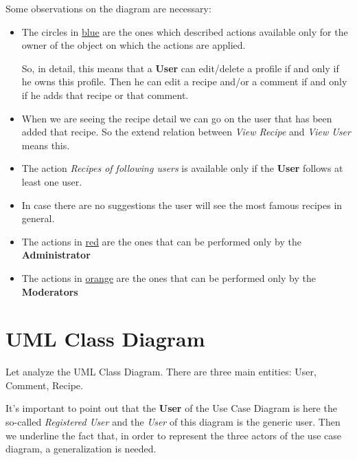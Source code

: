 \documentclass[a4paper]{report}
\begin{document}
\noindent Some observations on the diagram are necessary:
\begin{itemize}
	\item The circles in \underline{blue} are the ones which described actions available only for the owner of the object on which the actions are applied.
	
	\noindent So, in detail, this means that a \textbf{User} can edit/delete a profile if and only if he owns this profile. Then he can edit a recipe and/or a comment if and only if he adds that recipe or that comment.
	
	\item When we are seeing the recipe detail we can go on the user that has been added that recipe. So the extend relation between \emph{View Recipe} and \emph{View User} means this.
	
	\item The action \emph{Recipes of following users} is available only if the \textbf{User} follows at least one user.
	
	\item In case there are no suggestions the user will see the most famous recipes in general.
	
	\item The actions in \underline{red} are the ones that can be performed only by the \textbf{Administrator}
	
	\item The actions in \underline{orange} are the ones that can be performed only by the \textbf{Moderators}
\end{itemize}


\section{UML Class Diagram}
Let analyze the UML Class Diagram. There are three main entities: User, Comment, Recipe.

\noindent It's important to point out that the \textbf{User} of the Use Case Diagram is here the so-called \emph{Registered User} and the \emph{User} of this diagram is the generic user. Then we underline the fact that, in order to represent the three actors of the use case diagram, a generalization is needed.
 
\end{document}

